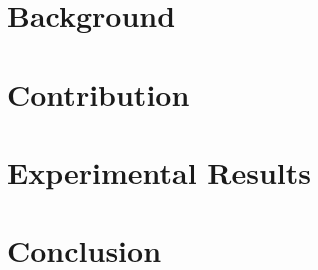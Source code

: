\documentclass[12pt,twoside]{report}
\begin{document}







\chapter{Background}



\chapter{Contribution}


\chapter{Experimental Results}


\chapter{Conclusion}



\end{document}
